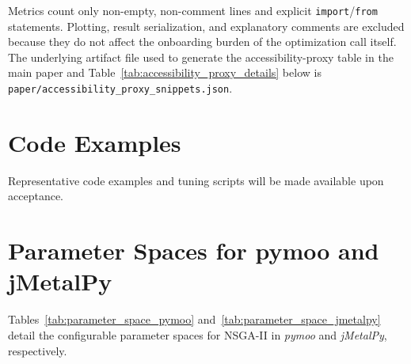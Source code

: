 \documentclass[final,5p,times,twocolumn]{elsarticle}
\begin{document}
Metrics count only non-empty, non-comment lines and explicit \texttt{import}/\texttt{from} statements. Plotting, result serialization, and explanatory comments are excluded because they do not affect the onboarding burden of the optimization call itself. The underlying artifact file used to generate the accessibility-proxy table in the main paper and Table~\ref{tab:accessibility_proxy_details} below is \texttt{paper/accessibility\_proxy\_snippets.json}.




\section{Code Examples}
\label{app:code}

Representative code examples and tuning scripts will be made available upon acceptance.


\section{Parameter Spaces for pymoo and jMetalPy}
\label{app:parameter_spaces}

Tables~\ref{tab:parameter_space_pymoo} and~\ref{tab:parameter_space_jmetalpy} detail the configurable parameter spaces for NSGA-II in \textit{pymoo} and \textit{jMetalPy}, respectively.
\end{document}
